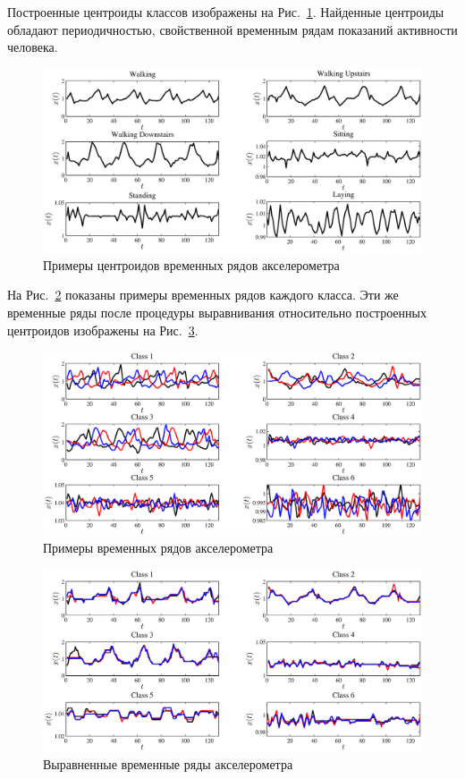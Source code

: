 	Построенные центроиды классов изображены на Рис.~\ref{centroids_real}.
	Найденные центроиды обладают периодичностью, свойственной временным рядам показаний активности человека.
	\begin{figure}[ht]
		\centering
		\includegraphics[width=1\linewidth]{figs/ch4/centroids_200_2}
		\caption{Примеры центроидов временных рядов акселерометра}
		\label{centroids_real}
	\end{figure}
	На Рис.~\ref{raw_ts} показаны примеры временных рядов каждого класса. Эти же временные ряды после процедуры выравнивания относительно построенных центроидов изображены на Рис.~\ref{aligned_ts}.
	\begin{figure}[!ht]
		\centering
		\includegraphics[width=1\linewidth]{figs/ch4/raw_ts}
		\caption{Примеры временных рядов акселерометра}
		\label{raw_ts}
	\end{figure}
	\begin{figure}[!ht]
		\centering
		\includegraphics[width=1\linewidth]{figs/ch4/aligned_ts}
		\caption{Выравненные временные ряды акселерометра}
		\label{aligned_ts}
	\end{figure}
	
